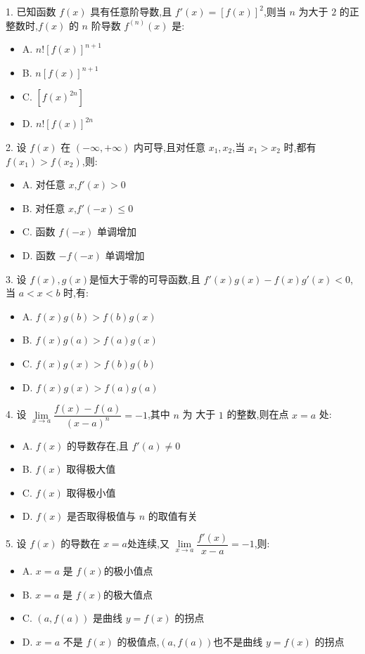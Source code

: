 1. 已知函数 $f(x)$ 具有任意阶导数,且 $f'(x)=[f(x)]^{2}$,则当 $n$ 为大于 $2$ 的正整数时,$f(x)$ 的 $n$ 阶导数 $f^{(n)}(x)$ 是:
\begin{itemize}
	\item A. $n![f(x)]^{n+1}$
	\item B. $n[f(x)]^{n+1}$
	\item C. $[f(x)^{2n}]$
	\item D. $n![f(x)]^{2n}$
\end{itemize}

2. 设 $f(x)$ 在 $(-\infty,+\infty)$ 内可导,且对任意 $x_{1},x_{2}$,当 $x_{1}>x_{2}$ 时,都有 $f(x_{1})>f(x_{2})$,则:
\begin{itemize}
	\item A. 对任意 $x$,$f'(x)>0$
	\item B. 对任意 $x$,$f'(-x)\leq 0$
	\item C. 函数 $f(-x)$ 单调增加
	\item D. 函数 $-f(-x)$ 单调增加
\end{itemize}

3. 设 $f(x),g(x)$是恒大于零的可导函数,且 $f'(x)g(x)-f(x)g'(x)<0$,当 $a<x<b$ 时,有:
\begin{itemize}
	\item A. $f(x)g(b)>f(b)g(x)$
	\item B. $f(x)g(a)>f(a)g(x)$
	\item C. $f(x)g(x)>f(b)g(b)$
	\item D. $f(x)g(x)>f(a)g(a)$
\end{itemize}

4. 设 $\lim\limits_{x\to a}\dfrac{f(x)-f(a)}{(x-a)^{n}}=-1$,其中 $n$ 为 大于 $1$ 的整数,则在点 $x=a$ 处:
\begin{itemize}
	\item A. $f(x)$ 的导数存在,且 $f'(a)\neq 0$
	\item B. $f(x)$ 取得极大值
	\item C. $f(x)$ 取得极小值
	\item D. $f(x)$ 是否取得极值与 $n$ 的取值有关
\end{itemize}

5. 设 $f(x)$ 的导数在 $x=a$处连续,又 $\lim\limits_{x\to a}\dfrac{f'(x)}{x-a}=-1$,则:
\begin{itemize}
	\item A. $x=a$ 是 $f(x)$的极小值点
	\item B. $x=a$ 是 $f(x)$的极大值点
	\item C. $(a,f(a))$ 是曲线 $y=f(x)$ 的拐点
	\item D. $x=a$ 不是 $f(x)$ 的极值点,$(a,f(a))$也不是曲线 $y=f(x)$ 的拐点
\end{itemize}

